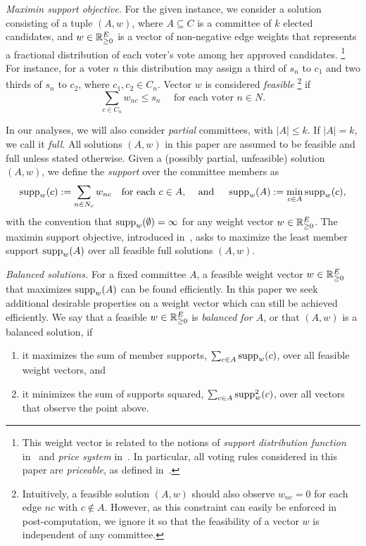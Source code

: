 \emph{Maximin support objective.} 
For the given instance, we consider a solution consisting of a tuple $(A,w)$, where $A\subseteq C$ is a committee of $k$ elected candidates, and $w\in\mathbb{R}_{\geq 0}^E$ is a vector of non-negative edge weights that represents a fractional distribution of each voter's vote among her approved candidates.%
\footnote{This weight vector is related to the notions of \emph{support distribution function} in~\cite{sanchez2016maximin} and \emph{price system} in~\cite{peters2019proportionality}. In particular, all voting rules considered in this paper are \emph{priceable}, as defined in~\cite{peters2019proportionality}.} 
For instance, for a voter $n$ this distribution may assign a third of $s_n$ to $c_1$ and two thirds of $s_n$ to $c_2$, where $c_1, c_2\in C_n$.
Vector $w$ is considered \emph{feasible}%
\footnote{Intuitively, a feasible solution $(A,w)$ should also observe $w_{nc}=0$ for each edge $nc$ with $c\not\in A$. 
However, as this constraint can easily be enforced in post-computation, we ignore it so that the feasibility of a vector $w$ is independent of any committee.} 
if  %
%
\begin{equation}
    \sum_{c\in C_n} w_{nc}\leq s_n \quad \text{ for each voter } n\in N. \label{eq:feasible}
\end{equation}

In our analyses, we will also consider \emph{partial} committees, with $|A|\leq k$. If $|A|=k$, we call it \emph{full}. 
All solutions $(A,w)$ in this paper are assumed to be feasible and full unless stated otherwise. 
Given a (possibly partial, unfeasible) solution $(A,w)$, we define the \emph{support} over the committee members as 
\begin{equation}
\operatorname{supp}_w(c):=\sum_{n\in N_c} w_{nc} \quad \text{for each $c\in A, \quad$ and } \quad \operatorname{supp}_w(A):=\min_{c\in A} \operatorname{supp}_w(c), \label{eq:support}
\end{equation}
with the convention that $\operatorname{supp}_w(\emptyset)=\infty$ for any weight vector $w\in\mathbb{R}_{\geq 0}^E$. 
The maximin support objective, introduced in~\cite{sanchez2016maximin}, asks to maximize the least member support $\operatorname{supp}_w(A)$ over all feasible full solutions $(A,w)$. 

\emph{Balanced solutions.}
For a fixed committee $A$, a feasible weight vector $w\in\mathbb{R}_{\geq 0}^E$ that maximizes $\operatorname{supp}_w(A)$ can be found efficiently. In this paper we seek additional desirable properties on a weight vector which can still be achieved efficiently. We say that a feasible $w\in\mathbb{R}_{\geq 0}^E$ is \emph{balanced for $A$}, or that $(A,w)$ is a balanced solution, if
\begin{enumerate}
    \item it maximizes the sum of member supports, $\sum_{c\in A} \operatorname{supp}_w(c)$, over all feasible weight vectors, and 
    \item it minimizes the sum of supports squared, $\sum_{c\in A} \operatorname{supp}_w^2(c)$, over all vectors that observe the point above. 
\end{enumerate}

